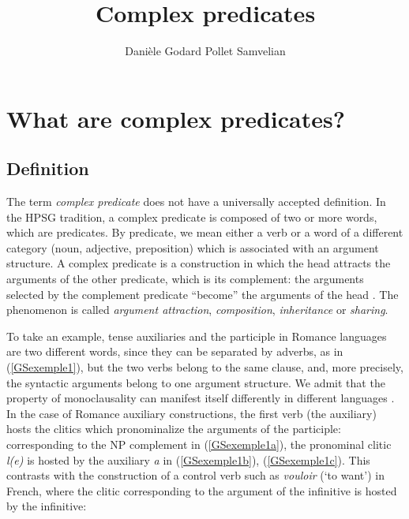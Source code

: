 \documentclass[output=paper
                ,modfonts
                ,nonflat
	        ,collection
	        ,collectionchapter
	        ,collectiontoclongg
 	        ,biblatex
                ,babelshorthands
                ,newtxmath
                ,draftmode
                ,colorlinks, citecolor=brown
]{./langsci/langscibook}
\author{%
	Danièle Godard\affiliation{Université Paris Diderot}%
	\lastand Pollet Samvelian\affiliation{Université Sorbonne Nouvelle}
}
\title{Complex predicates}
\begin{document}
\maketitle
\label{chap-complex-predicates}


{


\section{What are complex predicates?}



\subsection{Definition}\label{GSsection1.1}


The term \emph{complex predicate} does not have a universally accepted definition. In the HPSG tradition, a complex predicate is composed of two or more words, which are predicates. By predicate, we mean either a verb or a word of a different category (noun, adjective, preposition) which is associated with an argument structure. A complex predicate is a construction in which the head attracts the arguments of the other predicate, which is its complement: the arguments selected by the complement predicate ``become'' the arguments of the head \citep{HN89b, HN98a}. The phenomenon is called \emph{argument attraction}, \emph{composition}, \emph{inheritance} or \emph{sharing}.

To take an example, tense auxiliaries and the participle in Romance languages are two different words, since they can be separated by adverbs, as in (\ref{GSexemple1}), but the two verbs belong to the same clause, and, more precisely, the syntactic arguments belong to one argument structure. We admit that the property of monoclausality can manifest itself differently in different languages \citep{Butt2010a}. In the case of Romance auxiliary constructions, the first verb (the auxiliary) hosts the clitics which pronominalize the arguments of the participle: corresponding to the NP complement in (\ref{GSexemple1a}), the pronominal clitic \emph{l(e)} is hosted by the auxiliary \emph{a} in (\ref{GSexemple1b}), (\ref{GSexemple1c}). This contrasts with the construction of a control verb such as \emph{vouloir} (`to want') in French, where the clitic corresponding to the argument of the infinitive is hosted by the infinitive: 

}
\end{document}
